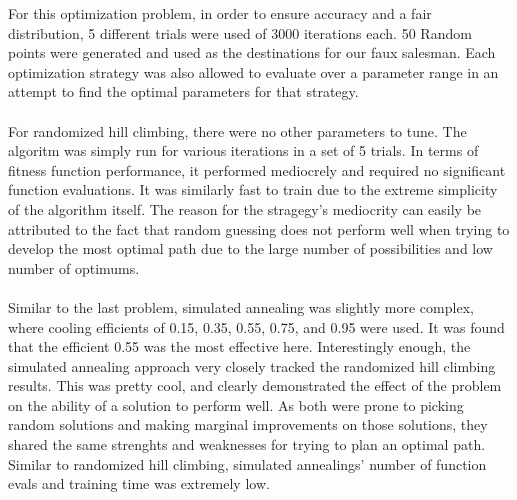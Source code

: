 \documentclass[h]{article}
\begin{document}
For this optimization problem, in order to ensure accuracy and a fair distribution, 5 different trials were 
used of 3000 iterations each.  50 Random points were generated and used as the destinations for our faux salesman.
Each optimization strategy was also allowed to evaluate over 
a parameter range in an attempt to find the optimal parameters for that 
strategy.
\\ \\
For randomized hill climbing, there were no other parameters to tune.  The 
algoritm was simply run for various iterations in a set of 5 
trials.  In terms of fitness function performance, it performed mediocrely and required no significant function evaluations. It was similarly fast to train due to the extreme simplicity 
of the algorithm itself.  The reason for the stragegy's mediocrity can easily be 
attributed to the fact that random guessing does not perform well when trying to 
develop the most optimal path due to the large number of possibilities and low 
number of optimums.
\\ \\
Similar to the last problem, simulated annealing was slightly more complex, where cooling efficients of 0.15, 
0.35, 0.55, 0.75, and 0.95 were used.  It was found that the efficient 0.55 was 
the most effective here.  Interestingly enough, the simulated annealing approach very closely tracked the randomized hill climbing results. 
 This was pretty cool, and clearly demonstrated the effect of the problem on the 
 ability of a solution to perform well.  As both were prone to picking random 
 solutions and making marginal improvements on those solutions, they shared the 
 same strenghts and weaknesses for trying to plan an optimal path.  Similar to randomized hill climbing, simulated annealings' number 
 of function evals and training time was extremely low.
\\ \\
\end{document}
